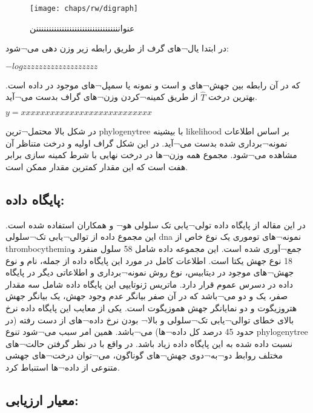 \begin{figure}[!ht]
	\centerline{\texttt{[image: chaps/rw/digraph]}}
	\caption{عنوانننننننننننننننننننننننننننننننننن}
	\label{fig:ch_rw:digraph}
\end{figure}



در ابتدا یال¬های گرف از طریق رابطه زیر وزن دهی می¬شود:

$-log zzzzzzzzzzzzzzzzzzz$

که در آن  رابطه بین جهش¬های  و  است و  نمونه یا سمپل¬های موجود در داده است. بهترین درخت $\hat{T}$  از طریق کمینه¬کردن وزن¬های گراف بدست می¬آید.

\begin{math}
	y=xxxxxxxxxxxxxxxxxxxxxxxxxxx
\end{math}

در شکل بالا محتمل¬ترین \gls{phylogenytree} با بیشینه \gls{likelihood} بر اساس اطلاعات نمونه¬برداری شده بدست می¬آید. در این شکل گراف اولیه و درخت متناظر آن مشاهده می¬شود. مجموع همه وزن¬ها در درخت نهایی با شرط کمینه سازی برابر هفت است که این مقدار کمترین مقدار ممکن است. 


\subsection{پایگاه داده:}

در این مقاله از پایگاه داده تولی¬یابی تک سلولی هو¬ و همکاران \cite{hou2012single} استفاده شده است. این مجموع داده از توالی¬یابی تک¬سلولی \gls{dna} نمونه¬های توموری یک نوع خاص از \gls{thrombocythemia}جمع¬آوری شده است. این مجموعه داده شامل 58 سلول منفرد و 18 نوع جهش یکتا است. اطلاعات کامل در مورد این پایگاه داده از جمله، نام و نوع جهش¬های موجود در دیتابیس، نوع روش نمونه¬برداری و اطلاعاتی دیگر در پایگاه داده  در دسرس عموم قرار دارد. ماتریس ژنوتایپی این پایگاه داده شامل سه مقدار صفر، یک و دو می¬باشد که در آن صفر بیانگر عدم وجود جهش،  یک بیانگر جهش هتروزیگوت و دو نمایانگر جهش هموزیگوت است. یکی از معایب این پایگاه داده نرخ بالای خطای توالی¬یابی تک¬سلولی و بالا¬ بودن نرخ داده¬های از دست رفته (در حدود 45 درصد کل داده¬ها) می¬باشد. همین امر سبب می¬شود تنوع \gls{phylogenytree} نسبت داده شده به این پایگاه داده زیاد باشد. در واقع با در نظر گرفتن حالت¬های مختلف روابط دو¬به¬دوی جهش¬های گوناگون، می¬توان درخت¬های جهشی متنوعی از داده¬ها استنباط کرد. 

\subsection{معیار ارزیابی: }























